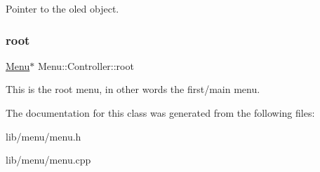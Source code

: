 Pointer to the oled object. \hypertarget{class_menu_1_1_controller_a211b6de05f7eed25f3a7f504c42316e0}{}\label{class_menu_1_1_controller_a211b6de05f7eed25f3a7f504c42316e0} 
\subsubsection{\texorpdfstring{root}{root}}
{\footnotesize\ttfamily \hyperlink{struct_menu_1_1_menu}{Menu}$\ast$ Menu\+::\+Controller\+::root\hspace{0.3cm}{\ttfamily [private]}}

This is the root menu, in other words the first/main menu. 

The documentation for this class was generated from the following files\+:\begin{DoxyCompactItemize}
\item 
lib/menu/menu.\+h\item 
lib/menu/menu.\+cpp\end{DoxyCompactItemize}
